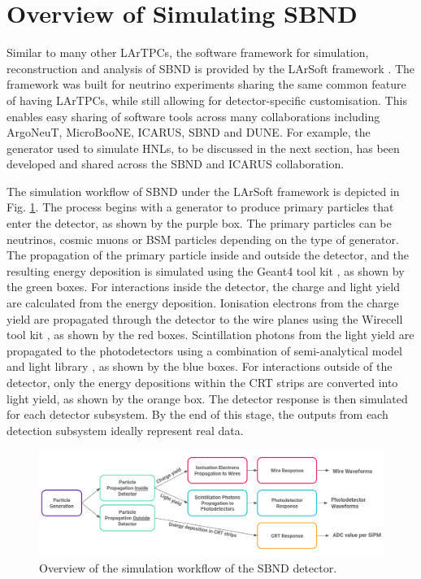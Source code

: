 \section{Overview of Simulating SBND}
\label{sec:overview_sim}

Similar to many other LArTPCs, the software framework for simulation, reconstruction and analysis of SBND is provided by the LArSoft framework \cite{larsoft}. 
The framework was built for neutrino experiments sharing the same common feature of having LArTPCs, while still allowing for detector-specific customisation. 
This enables easy sharing of software tools across many collaborations including ArgoNeuT, MicroBooNE, ICARUS, SBND and DUNE. 
For example, the generator used to simulate HNLs, to be discussed in the next section, has been developed and shared across the SBND and ICARUS collaboration.

The simulation workflow of SBND under the LArSoft framework is depicted in Fig. \ref{fig:Sim_Workflow}.
The process begins with a generator to produce primary particles that enter the detector, as shown by the purple box.
The primary particles can be neutrinos, cosmic muons or BSM particles depending on the type of generator.
The propagation of the primary particle inside and outside the detector, and the resulting energy deposition is simulated using the Geant4 tool kit \cite{geant4}, as shown by the green boxes.
For interactions inside the detector, the charge and light yield are calculated from the energy deposition.
Ionisation electrons from the charge yield are propagated through the detector to the wire planes using the Wirecell tool kit \cite{wirecell}, as shown by the red boxes.
Scintillation photons from the light yield are propagated to the photodetectors using a combination of semi-analytical model and light library \cite{sbnd_pds_paper}, as shown by the blue boxes.
For interactions outside of the detector, only the energy depositions within the CRT strips are converted into light yield, as shown by the orange box.
The detector response is then simulated for each detector subsystem.
By the end of this stage, the outputs from each detection subsystem ideally represent real data.

\begin{figure}[htbp!] 
\centering    
\includegraphics[width=1.0\textwidth]{Sim_Workflow}
\caption[Sim_Workflow]{
Overview of the simulation workflow of the SBND detector.
}
\label{fig:Sim_Workflow}
\end{figure}

